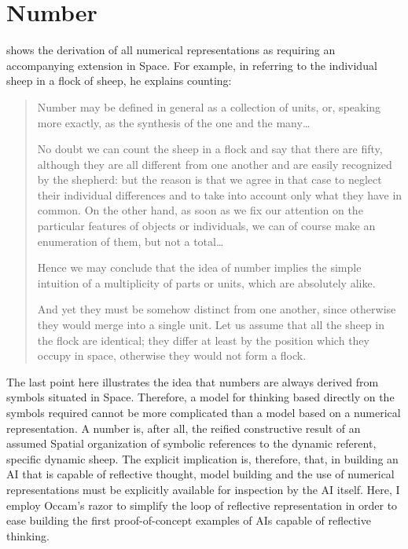 \section{Number}
\label{section:number}

\cite{bergson:1910} shows the derivation of all numerical
representations as requiring an accompanying extension in Space.  For
example, in referring to the individual sheep in a flock of sheep, he
explains counting:

\begin{quote}
Number may be defined in general as a collection of units, or,
speaking more exactly, as the synthesis of the one and the
many\ldots

No doubt we can count the sheep in a flock and say that there are
fifty, although they are all different from one another and are easily
recognized by the shepherd: but the reason is that we agree in that
case to neglect their individual differences and to take into account
only what they have in common.  On the other hand, as soon as we fix
our attention on the particular features of objects or individuals, we
can of course make an enumeration of them, but not a total\ldots

Hence we may conclude that the idea of number implies the simple
intuition of a multiplicity of parts or units, which are absolutely
alike.

And yet they must be somehow distinct from one another, since
otherwise they would merge into a single unit.  Let us assume that all
the sheep in the flock are identical; they differ at least by the
position which they occupy in space, otherwise they would not form a
flock.
\end{quote}

The last point here illustrates the idea that numbers are always
derived from symbols situated in Space.  Therefore, a model for
thinking based directly on the symbols required cannot be more
complicated than a model based on a numerical representation.  A
number is, after all, the reified constructive result of an assumed
Spatial organization of symbolic references to the dynamic referent,
specific dynamic sheep.  The explicit implication is, therefore, that,
in building an AI that is capable of reflective thought, model
building and the use of numerical representations must be explicitly
available for inspection by the AI itself.  Here, I employ Occam's
razor to simplify the loop of reflective representation in order to
ease building the first proof-of-concept examples of AIs capable of
reflective thinking.

